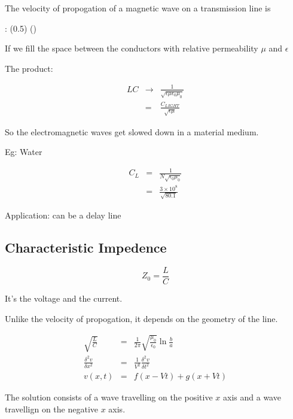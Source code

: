 \documentclass[a4paper,12pt]{article}
\begin{document}
The velocity of propogation of a magnetic wave on a transmission line is

\begin{table}[hbtp]

\xy <1cm, 0cm>:
{\ellipse(0.5){}}
{\ellipse(){}}
\endxy

\end{table}

If we fill the space between the conductors with relative permeability
$\mu$ and $\epsilon$ %

The product:

\begin{eqnarray*}
LC & \to & \frac{1}{\sqrt{\epsilon \mu \epsilon_{0} \mu_{0}}} \\
	& = & \frac{C_{LIGHT}}{\sqrt{\epsilon \mu}}
\end{eqnarray*}

So the electromagnetic waves get slowed down in a material medium.

Eg: Water

\begin{eqnarray*}
C_{L} & = & \frac{1}{N \sqrt{\epsilon_{0} \mu_{0}}} \\
		& = & \frac{3 \times 10^{8}}{\sqrt{80.1}}
\end{eqnarray*}

Application: can be a delay line

\subsection{Characteristic Impedence}

\[ Z_{0} = \frac{L}{C} \]

It's the voltage and the current.


Unlike the velocity of propogation, it depends on the geometry of the
line.

\begin{eqnarray*}
\sqrt{\frac{L}{C}} & = & 
\frac{1}{2 \pi}\sqrt{\frac{\mu_{0}}{\epsilon_{0}}} \ln{\frac{b}{a}} \\
\frac{\delta^{2} v}{\delta x^{2}} & = & 
\frac{1}{V^{2}} \frac{\delta^{2}v}{\delta t^{2}} \\
v(x,t) & = & f (x - Vt) + g(x + Vt)
\end{eqnarray*}

The solution consists of a wave travelling on the positive $x$ axis and
a wave travellign on the negative $x$ axis.
\end{document}
